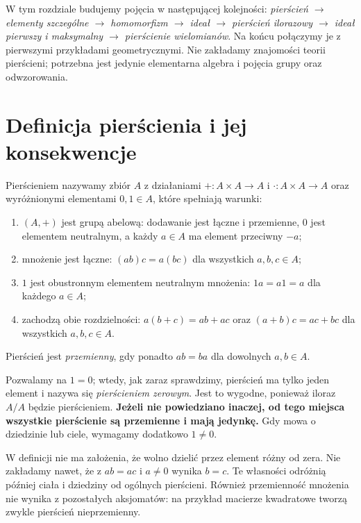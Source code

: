 W tym rozdziale budujemy pojęcia w następującej kolejności:
\emph{pierścień $\to$ elementy szczególne $\to$ homomorfizm $\to$
ideał $\to$ pierścień ilorazowy $\to$ ideał pierwszy i maksymalny $\to$
pierścienie wielomianów}. Na końcu połączymy je z pierwszymi przykładami
geometrycznymi. Nie zakładamy znajomości teorii pierścieni; potrzebna jest
jedynie elementarna algebra i pojęcia grupy oraz odwzorowania.

\section{Definicja pierścienia i jej konsekwencje}

\begin{definicja}[Pierścień]
\label{def:pierscien}
Pierścieniem nazywamy zbiór $A$ z działaniami
$+\colon A\times A\to A$ i $\cdot\colon A\times A\to A$ oraz wyróżnionymi
elementami $0,1\in A$, które spełniają warunki:
\begin{enumerate}[label=(P\arabic*)]
\item $(A,+)$ jest grupą abelową: dodawanie jest łączne i przemienne,
$0$ jest elementem neutralnym, a każdy $a\in A$ ma element przeciwny $-a$;
\item mnożenie jest łączne: $(ab)c=a(bc)$ dla wszystkich $a,b,c\in A$;
\item $1$ jest obustronnym elementem neutralnym mnożenia:
$1a=a1=a$ dla każdego $a\in A$;
\item zachodzą obie rozdzielności:
$a(b+c)=ab+ac$ oraz $(a+b)c=ac+bc$ dla wszystkich $a,b,c\in A$.
\end{enumerate}
Pierścień jest \emph{przemienny}, gdy ponadto $ab=ba$ dla dowolnych $a,b\in A$.
\end{definicja}

Pozwalamy na $1=0$; wtedy, jak zaraz sprawdzimy, pierścień ma tylko jeden
element i nazywa się \emph{pierścieniem zerowym}. Jest to wygodne, ponieważ
iloraz $A/A$ będzie pierścieniem. \textbf{Jeżeli nie powiedziano inaczej,
od tego miejsca wszystkie pierścienie są przemienne i mają jedynkę.}
Gdy mowa o dziedzinie lub ciele, wymagamy dodatkowo $1\ne0$.

\begin{uwaga}
W definicji nie ma założenia, że wolno dzielić przez element różny od zera.
Nie zakładamy nawet, że z $ab=ac$ i $a\ne0$ wynika $b=c$.
Te własności odróżnią później ciała i dziedziny od ogólnych pierścieni.
Również przemienność mnożenia nie wynika z pozostałych aksjomatów:
na przykład macierze kwadratowe tworzą zwykle pierścień nieprzemienny.
\end{uwaga}

